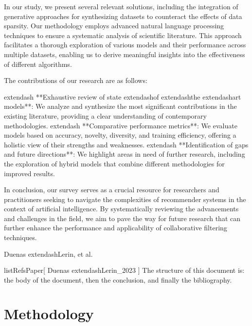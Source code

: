 \documentclass[runningheads]{llncs}
\begin{document}
In our study, we present several relevant solutions, including the integration of generative approaches for synthesizing datasets to counteract the effects of data sparsity. Our methodology employs advanced natural language processing techniques to ensure a systematic analysis of scientific literature. This approach facilitates a thorough exploration of various models and their performance across multiple datasets, enabling us to derive meaningful insights into the effectiveness of different algorithms.

The contributions of our research are as follows:

	extendash{} **Exhaustive review of state	extendash{}of	extendash{}the	extendash{}art models**: We analyze and synthesize the most significant contributions in the existing literature, providing a clear understanding of contemporary methodologies.
	extendash{} **Comparative performance metrics**: We evaluate models based on accuracy, novelty, diversity, and training efficiency, offering a holistic view of their strengths and weaknesses.
	extendash{} **Identification of gaps and future directions**: We highlight areas in need of further research, including the exploration of hybrid models that combine different methodologies for improved results.

In conclusion, our survey serves as a crucial resource for researchers and practitioners seeking to navigate the complexities of recommender systems in the context of artificial intelligence. By systematically reviewing the advancements and challenges in the field, we aim to pave the way for future research that can further enhance the performance and applicability of collaborative filtering techniques.

\begin{thebibliography}{9}
 Duenas	extendash{}Lerin, et al. 
\end{thebibliography}

\newpage
listRefsPaper[ Duenas	extendash{}Lerin_2023 ]
 The structure of this document is: the body of the document, then the conclusion, and finally the bibliography.
\section{Methodology}
\end{document}
